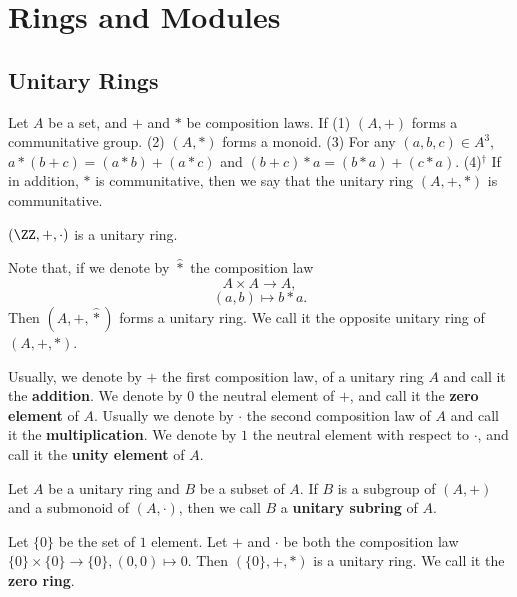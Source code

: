 \chapter{Rings and Modules}
\section{Unitary Rings}
\begin{definitionenv}
    Let $A$ be a set,  and $+$ and $*$ be composition laws. If 
    \newline
    (1) $(A, +)$ forms a communitative group.
    \newline
    (2) $(A, *)$ forms a monoid.
    \newline
    (3) For any $(a, b, c)\in A^3$,  $a*(b+c)=(a*b)+(a*c)$ and $(b+c)*a=(b*a)+(c*a)$.
    \newline
    (4)$^\dagger$ If in addition,  $*$ is communitative,  then we say that the unitary ring $(A, +, *)$ is communitative.
\end{definitionenv}
\begin{exampleenv}
    $(\ZZ, +, \cdot)$ is a unitary ring.
\end{exampleenv}
Note that,  if we denote by $\hat{*}$ the composition law 
$$A\times A\longrightarrow A, $$
$$(a, b)\longmapsto b*a.$$
Then $(A, +, \hat{*})$ forms a unitary ring. We call it the opposite unitary ring of $(A, +, *)$.
\begin{notationenv}
    Usually,  we denote by $+$ the first composition law,  of a unitary ring $A$ and call it the \textbf{addition}. We denote by $0$ the neutral element of $+$,  and call it the \textbf{zero element} of $A$. Usually we denote by $\cdot$ the second composition law of $A$ and call it the \textbf{multiplication}. We denote by $1$ the neutral element with respect to $\cdot$,  and call it the \textbf{unity element} of $A$.
\end{notationenv}
\begin{definitionenv}
    Let $A$ be a unitary ring and $B$ be a subset of $A$. If $B$ is a subgroup of $(A, +)$ and a submonoid of $(A, \cdot)$,  then we call $B$ a \textbf{unitary subring} of $A$.
\end{definitionenv}
\begin{exampleenv}
    Let $\{0\}$ be the set of $1$ element. Let $+$ and $\cdot$ be both the composition law $\{0\}\times\{0\}\rightarrow\{0\}, (0, 0)\mapsto0$. Then $(\{0\}, +, *)$ is a unitary ring. We call it the \textbf{zero ring}.
\end{exampleenv}
